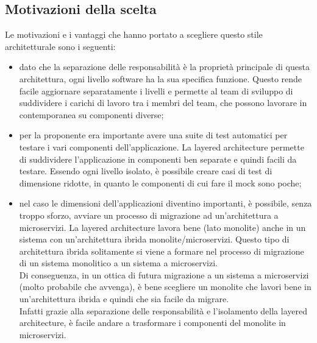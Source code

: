 \subsection{Motivazioni della scelta}
Le motivazioni e i vantaggi che hanno portato a scegliere questo stile architetturale sono i seguenti:
\begin{itemize}
    \item dato che la separazione delle responsabilità è la proprietà principale di questa architettura,
        ogni livello software ha la sua specifica funzione. Questo rende facile aggiornare 
        separatamente i livelli e permette al team di sviluppo di suddividere i carichi di lavoro tra i 
        membri del team, che possono lavorare in contemporanea su componenti diverse;
    \item per la proponente era importante avere una suite di test automatici per testare i vari componenti
        dell'applicazione. La layered architecture
        permette di suddividere l'applicazione in componenti ben separate e quindi facili da testare.
        Essendo ogni livello isolato, è possibile creare casi di test di dimensione ridotte, 
        in quanto le componenti di cui fare il \gls{mock} sono poche;
    \item nel caso le dimensioni dell'applicazioni diventino importanti, è possibile, senza troppo sforzo, avviare un processo
        di migrazione ad un'architettura a microservizi. La layered architecture lavora bene (lato monolite) anche
        in un sistema con un'architettura ibrida monolite/microservizi. Questo tipo di architettura
        ibrida solitamente si viene a formare nel processo di migrazione di un sistema monolitico a un sistema a microservizi.
        \\
        Di conseguenza, in un ottica di futura migrazione a un sistema a microservizi (molto probabile che avvenga), è
        bene scegliere un monolite che lavori bene in un'architettura ibrida e quindi che sia facile da migrare.
        \\
        Infatti grazie alla separazione delle responsabilità e l'isolamento della layered architecture, è facile andare
        a trasformare i componenti del monolite in microservizi.
\end{itemize}
\clearpage
